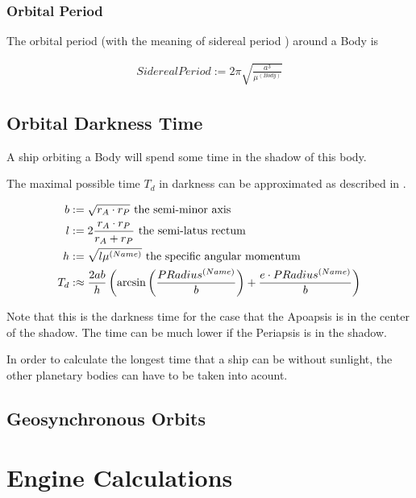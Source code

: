 \documentclass[11pt]{report}
\begin{document}
\subsection{Orbital Period}

The  orbital period (with the meaning of
 sidereal period \cite{SIDPER}) around a Body
is

\begin{align}
SiderealPeriod := 2\pi\sqrt{\frac{a^3}{\mu^{(Body)}}}
\end{align}

\section{Orbital Darkness Time}

A ship orbiting a Body will spend some time in the shadow of this
body. 

The maximal possible time $T_d$ in darkness can be approximated as
described in \cite{DarknessTime}.

\begin{align}
  b & := \sqrt{r_A \cdot r_P} \textrm{ the semi-minor axis}\index{Semi-minor axis}\\
  l & := 2\frac{r_A\cdot r_P}{r_A + r_P} \textrm{ the semi-latus rectum} \index{Semi-latus rectum}\\
  h & := \sqrt{l\mu^{(Name)}} \textrm{ the specific angular momentum}\index{Specific angular momentum}\\
  T_d &:\approx \frac{2ab}{h}\left(\arcsin\left(\frac{PRadius^{(Name)}}{b}\right)+\frac{e\cdot PRadius^{(Name)}}{b}\right)
\end{align}

Note that this is the darkness time for the case that the Apoapsis is
in the center of the shadow. The time can be much lower if the
Periapsis is in the shadow.

In order to calculate the longest time that a ship can be without
sunlight, the other planetary bodies can have to be taken into acount.

\section{Geosynchronous Orbits}

\chapter{Engine Calculations}
\end{document}

